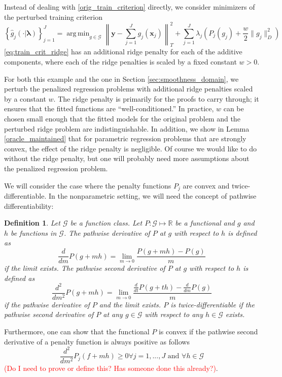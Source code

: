 \documentclass[12pt]{article}
\newtheorem{definition}{Definition}
\DeclareMathOperator*{\argmin}{arg\,min}
\begin{document}
Instead of dealing with \eqref{orig_train_criterion} directly, we consider minimizers of the perturbed training criterion
\begin{equation}
\label{eq:train_crit_ridge}
\left\{ \hat{g}_j(\cdot | \boldsymbol \lambda) \right \}_{j=1}^J = \argmin_{g\in \mathcal{G}} \left \| \boldsymbol y -  \sum_{j=1}^J g_j(\boldsymbol x_j) \right \|^2_T + \sum_{j=1}^J \lambda_j \left ( P_j(g_j) + \frac{w}{2} \| g_j \|^2_D \right )
\end{equation}
\eqref{eq:train_crit_ridge} has an additional ridge penalty for each of the additive components, where each of the ridge penalties is scaled by a fixed constant $w > 0$. 

For both this example and the one in Section \ref{sec:smoothness_domain}, we perturb the penalized regression problems with additional ridge penalties scaled by a constant $w$. The ridge penalty is primarily for the proofs to carry through; it ensures that the fitted functions are ``well-conditioned.'' In practice, $w$ can be chosen small enough that the fitted models for the original problem and the perturbed ridge problem are indistinguishable. In addition, we show in Lemma \ref{oracle_maintained} that for parametric regression problems that are strongly convex, the effect of the ridge penalty is negligible. Of course we would like to do without the ridge penalty, but one will probably need more assumptions about the penalized regression problem.

We will consider the case where the penalty functions $P_j$ are convex and twice-differentiable. In the nonparametric setting, we will need the concept of pathwise differentiability:
\begin{definition}
	Let $\mathcal{G}$ be a function class.
	Let $P:\mathcal{G} \mapsto \mathbb{R}$ be a functional and $g$ and $h$ be functions in $\mathcal{G}$.
	The pathwise derivative of $P$ at $g$ with respect to $h$ is defined as
	$$
	\frac{d}{d m} P(g + mh) = \lim_{m \rightarrow 0} \frac{P(g + mh) - P(g)}{m}
	$$
	if the limit exists.
	The pathwise second derivative of $P$ at $g$ with respect to $h$ is defined as
	$$
	\frac{d^2}{d m^2} P(g + mh) = \lim_{m \rightarrow 0} \frac{\frac{d}{d t} P(g + th) - \frac{d}{d m} P(g)}{m}
	$$	
	if the pathwise derivative of $P$ and the limit exists.
	$P$ is twice-differentiable if the pathwise second derivative of $P$ at any $g \in \mathcal{G}$ with respect to any $h \in \mathcal{G}$ exists.
\end{definition}
Furthermore, one can show that the functional $P$ is convex if the pathwise second derivative of a penalty function is always positive as follows
\begin{equation}
\frac{d^2}{d m^2} P_j(f + mh) \ge 0 \forall j= 1,...,J \text{ and } \forall h \in \mathcal{G}
\end{equation}
\textcolor{red}{(Do I need to prove or define this? Has someone done this already?)}. 
\end{document}
